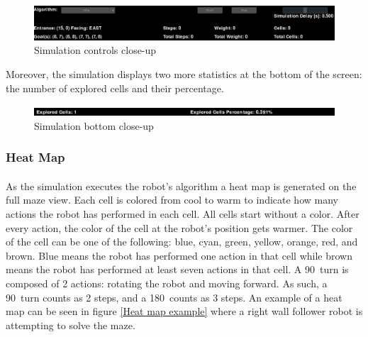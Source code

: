 \documentclass[12pt]{article}
\begin{document}
\begin{figure}[H]
\centering
\includegraphics[width=\textwidth]{images/simulation_HUD.png}
\caption{Simulation controls close-up}
\label{Simulation controls close-up}
\end{figure}

Moreover, the simulation displays two more statistics at the bottom of the screen: the number of explored \gls{cell}s and their percentage.

\begin{figure}[H]
\centering
\includegraphics[width=\textwidth]{images/simulation_HUD_bot.png}
\caption{Simulation bottom close-up}
\label{Simulation bottom close-up}
\end{figure}

\subsubsection{Heat Map}
\paragraph{}
As the simulation executes the robot's algorithm a heat map is generated on the full \gls{maze} view.
Each \gls{cell} is colored from cool to warm to indicate how many actions the robot has performed in each \gls{cell}.
All \gls{cell}s start without a color.
After every action, the color of the \gls{cell} at the robot's position gets warmer.
The color of the \gls{cell} can be one of the following: blue, cyan, green, yellow, orange, red, and brown.
Blue means the robot has performed one action in that \gls{cell} while brown means the robot has performed at least seven actions in that \gls{cell}.
A 90\textdegree\ turn is composed of 2 actions: rotating the robot and moving forward.
As such, a 90\textdegree\ turn counts as 2 steps, and a 180\textdegree\ counts as 3 steps.
An example of a heat map can be seen in figure \ref{Heat map example} where a right wall follower robot is attempting to solve the \gls{maze}.
\end{document}
